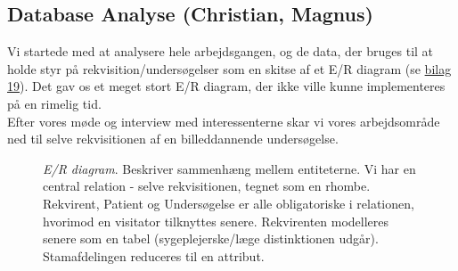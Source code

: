 \subsection*{Database Analyse (Christian, Magnus)}
Vi startede med at analysere hele arbejdsgangen, og de data, der bruges til at
holde styr på rekvisition/undersøgelser som en skitse af et E/R diagram (se
\hyperref[Bilag19]{bilag 19}). Det gav os et meget stort E/R diagram, der ikke
ville kunne implementeres på en rimelig tid.\\
Efter vores møde og interview med interessenterne skar vi vores arbejdsområde
ned til selve rekvisitionen af en billeddannende undersøgelse.
\FloatBarrier
\begin{figure}[h]
\centering
{}
\caption{\emph{E/R diagram}. Beskriver sammenhæng mellem entiteterne. Vi har en
central relation - selve rekvisitionen, tegnet som en rhombe. Rekvirent, Patient
og Undersøgelse er alle obligatoriske i relationen, hvorimod en visitator
tilknyttes senere. Rekvirenten modelleres senere som en tabel
(sygeplejerske/læge distinktionen udgår). Stamafdelingen reduceres til en
attribut. \label{er_diagram}}
\end{figure}
\FloatBarrier